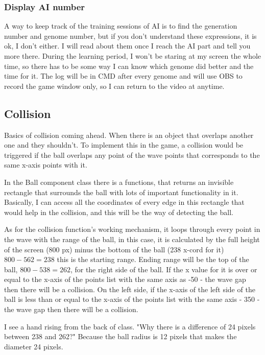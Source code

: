 \subsubsection{Display AI number}

A way to keep track of the training sessions of AI is to find the generation number and genome number, but if you don't understand these expressions, it is ok, I don't either. I will read about them once I reach the AI part and tell you more there. During the learning period, I won't be staring at my screen the whole time, so there has to be some way I can know which genome did better and the time for it. The log will be in CMD after every genome and will use OBS to record the game window only, so I can return to the video at anytime.

\subsection{Collision}\label{sec:collision}
Basics of collision coming ahead. When there is an object that overlaps another one and they shouldn't. To implement this in the game, a collision would be triggered if the ball overlaps any point of the wave points that corresponds to the same x-axis points with it.

In the Ball component class there is a  functions, that returns an invisible rectangle that surrounds the ball with lots of important functionality in it. Basically, I can access all the coordinates of every edge in this rectangle that would help in the collision, and this will be the way of detecting the ball.

As for the collision function's working mechanism, it loops through every point in the wave with the range of the ball, in this case, it is calculated by the full height of the screen (800 px) minus the bottom of the ball (238 x-cord for it) $800-562 = 238$ this is the starting range. Ending range will be the top of the ball, $800-538 = 262$, for the right side of the ball. If the x value for it is over or equal to the x-axis of the points list with the same axis as -50 - the wave gap then there will be a collision. On the left side, if the x-axis of the left side of the ball is less than or equal to the x-axis of the points list with the same axis - 350 - the wave gap then there will be a collision.

I see a hand rising from the back of class. "Why there is a difference of 24 pixels between 238 and 262?" Because the ball radius is 12 pixels that makes the diameter 24 pixels.


